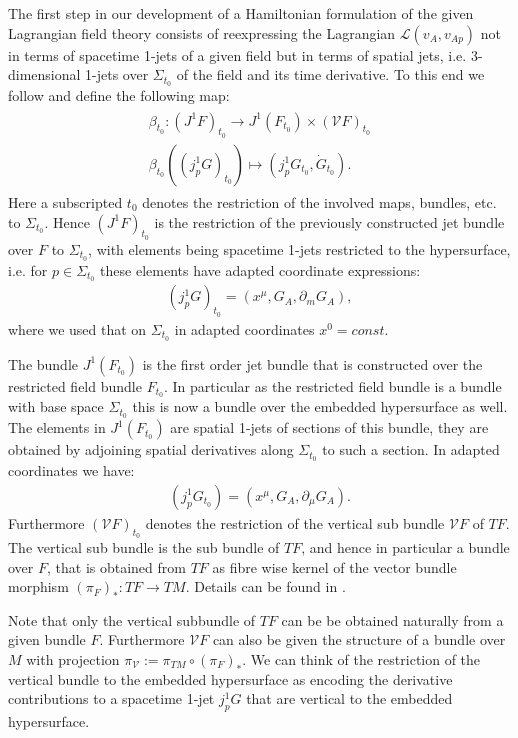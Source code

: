 \documentclass[a4paper,12pt, DIV=14, BCOR=5mm, twoside, headsepline]{scrbook}
\begin{document}
The first step in our development of a Hamiltonian formulation of the given Lagrangian field theory consists of reexpressing the Lagrangian $\mathcal{L}(v_A,v_{Ap})$ not in terms of spacetime 1-jets of a given field but in terms of spatial jets, i.e. 3-dimensional 1-jets over $\Sigma_{t_0}$ of the field and its time derivative. To this end we follow \cite{2004math.ph..11032G} and define the following map:
\begin{align}
    \begin{aligned}
    \beta_{t_0} : (J^1F)_{t_0} \longrightarrow J^1(F_{t_0}) \times (\mathcal{V}F)_{t_0} \\
    \beta_{t_0}((j^1_pG)_{t_0}) \longmapsto (j^1_pG_{t_0}, \dot{G}_{t_0}).
    \end{aligned}
\end{align}
Here a subscripted $t_0$ denotes the restriction of the involved maps, bundles, etc. to $\Sigma_{t_0}$. Hence $(J^1F)_{t_0}$ is the restriction of the previously constructed jet bundle over $F$ to $\Sigma_{t_0}$, with elements being spacetime 1-jets restricted to the hypersurface, i.e. for $p \in \Sigma_{t_0}$ these elements have adapted coordinate expressions: 
\begin{align}
(j^1_pG)_{t_0} = (x^{\mu},G_A,\partial_m G_A),
\end{align}
where we used that on $\Sigma_{t_0}$ in adapted coordinates $x^0=const$. 

The bundle $J^1(F_{t_0})$ is the first order jet bundle that is constructed over  the restricted field bundle $F_{t_0}$. In particular as the restricted field bundle is a bundle with base space $\Sigma_{t_0}$ this is now a bundle over the embedded hypersurface as well. The elements in $J^1(F_{t_0})$ are spatial 1-jets of sections of this bundle, they are obtained by adjoining spatial derivatives along $\Sigma_{t_0}$ to such a section. In adapted coordinates we have: 
\begin{align}
(j^1_pG_{t_0}) = (x^{\mu},G_A,\partial_{\mu} G_A).
\end{align}
Furthermore $(\mathcal{V}F)_{t_0}$ denotes the restriction of the vertical sub bundle $\mathcal{V}F$ of $TF$. The vertical sub bundle is the sub bundle of $TF$, and hence in particular a bundle over $F$, that is obtained from $TF$ as fibre wise kernel of the vector bundle morphism $(\pi_F)_{\ast} : TF \rightarrow
TM$. Details can be found in \cite{1998physics...1019G}. 

Note that only the vertical subbundle of $TF$ can be be obtained naturally from a given bundle $F$. Furthermore $\mathcal{V}F$ can also be given the structure of a bundle over $M$ with projection $\pi_{\mathcal{V}}:=\pi_{TM} \circ (\pi_F)_{\ast}$. We can think of the restriction of the vertical bundle to the embedded hypersurface as encoding the derivative contributions to a spacetime 1-jet $j^1_pG$ that are vertical to the embedded hypersurface.
\end{document}
